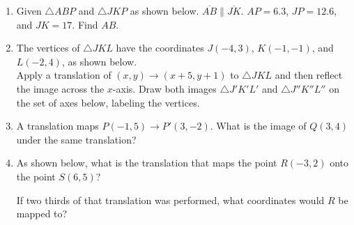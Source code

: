 \documentclass[12pt, twoside]{article}
\begin{document}
\begin{enumerate}
\newpage

 \item Given $\triangle ABP$ and $\triangle JKP$ as shown below. $\overline{AB} \parallel \overline{JK}$. $AP=6.3$, $JP=12.6$, and $JK=17$. Find $AB$.
 \begin{center}
     \end{center}

 \vspace{3cm}

   \item The vertices of $\triangle JKL$ have the coordinates $J(-4,3)$, $K(-1,-1)$, and $L(-2,4)$, as shown below. \\[0.25cm]
   Apply a translation of $(x,y) \rightarrow (x+5, y+1)$ to $\triangle JKL$ and then reflect the image across the $x$-axis. Draw both images $\triangle J'K'L'$ and $\triangle J''K''L''$ on the set of axes below, labeling the vertices.
   \begin{center}
   \end{center}

\newpage

  \item A translation maps $P(-1,5) \rightarrow P'(3,-2)$. What is the image of $Q(3,4)$ under the same translation?  \vspace{3cm}

  \item As shown below, what is the translation that maps the point $R(-3,2)$ onto the point $S(6, 5)$?
    \begin{center} %
    \end{center}
    If two thirds of that translation was performed, what coordinates would $R$ be mapped to? \vspace{2cm}


\end{enumerate}
\end{document}

